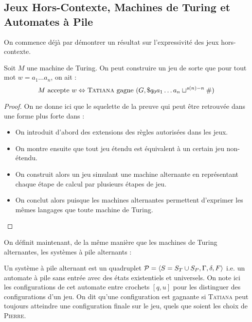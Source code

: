 \documentclass{cours}
\begin{document}
\subsection{Jeux Hors-Contexte, Machines de Turing et Automates à Pile}
On commence déjà par démontrer un résultat sur l'expressivité des jeux hors-contexte. 
\begin{theorem}
    Soit $M$ une machine de Turing. On peut construire un jeu de sorte que pour tout mot $w = a_{1}\ldots a_{n}$, on ait : 
    \[
        M \text{ accepte } w \Leftrightarrow \textsc{Tatiana} \text{ gagne } (G, \$q_{0}a_{1}\ldots a_{n}\sqcup^{s(n) - n}\#)  
    \]
\end{theorem}
\begin{proof}
    On ne donne ici que le squelette de la preuve qui peut être retrouvée dans une forme plus forte dans \cite{cfgames} : 
    \begin{itemize}
        \item On introduit d'abord des extensions des règles autorisées dans les jeux.
        \item On montre ensuite que tout jeu étendu est équivalent à un certain jeu non-étendu. 
        \item On construit alors un jeu simulant une machine alternante en représentant chaque étape de calcul par plusieurs étapes de jeu. 
        \item On conclut alors puisque les machines alternantes permettent d'exprimer les mêmes langages que toute machine de Turing. 
    \end{itemize}
\end{proof}

On définit maintenant, de la même manière que les machines de Turing alternantes, les systèmes à pile alternants : 
\begin{definition}
    Un système à pile alternant est un quadruplet $\mathcal{P} = \left\langle S = S_{T} \cup S_{P}, \Gamma, \delta, F \right\rangle$ i.e. un automate à pile sans entrée avec des états existentiels et universels. On note ici les configurations de cet automate entre crochets $\left[q, u\right]$ pour les distinguer des configurations d'un jeu. On dit qu'une configuration est gagnante si \textsc{Tatiana} peut toujours atteindre une configuration finale sur le jeu, quels que soient les choix de \textsc{Pierre}.
\end{definition}
\end{document}
